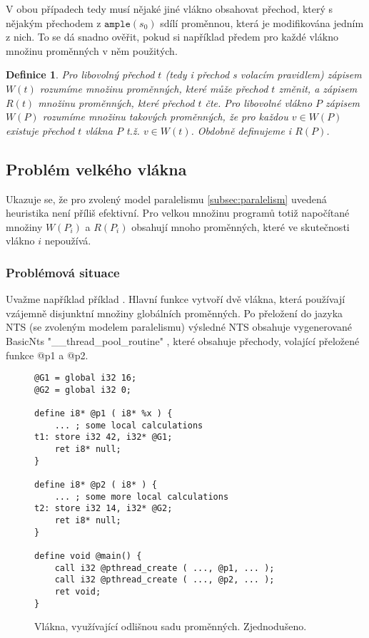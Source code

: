 \documentclass[10pt,a4paper,notitlepage]{report}
\newtheorem{definition}{Definice}
\begin{document}
V obou případech tedy musí nějaké jiné vlákno obsahovat přechod, který s nějakým přechodem z $\texttt{ample}(s_0)$ sdílí proměnnou, která je modifikována jedním z nich. To se dá snadno ověřit, pokud si například předem pro každé vlákno množinu proměnných v něm použitých.

\begin{definition}
Pro libovolný přechod $t$ (tedy i přechod s volacím pravidlem) zápisem $W(t)$ rozumíme množinu proměnných, které může přechod $t$ změnit, a zápisem $R(t)$ množinu proměnných, které přechod $t$ čte. Pro libovolné vlákno $P$ zápisem $W(P)$ rozumíme množinu takových proměnných, že pro každou $v \in W(P)$ existuje přechod $t$ vlákna $P$ t.ž. $v \in W(t)$. Obdobně definujeme i $R(P)$.
\end{definition}


\subsection{Problém velkého vlákna}
Ukazuje se, že pro zvolený model paralelismu \ref{subsec:paralelism} uvedená heuristika není příliš efektivní. Pro velkou množinu programů  totiž napočítané množiny $W(P_i)$ a $R(P_i)$ obsahují mnoho proměnných, které ve skutečnosti vlákno $i$ nepoužívá.


\subsubsection{Problémová situace}
Uvažme například příklad . Hlavní funkce vytvoří dvě vlákna, která používají vzájemně disjunktní množiny globálních proměnných. Po přeložení do jazyka NTS (se zvoleným modelem paralelismu) výsledné NTS obsahuje vygenerované BasicNts "__thread_pool_routine" , které obsahuje přechody, volající přeložené funkce @p1 a @p2.
\begin{figure}[h!]
\begin{lstlisting}
@G1 = global i32 16;
@G2 = global i32 0;

define i8* @p1 ( i8* %x ) {
	... ; some local calculations
t1:	store i32 42, i32* @G1;
	ret i8* null;
}

define i8* @p2 ( i8* ) {
	... ; some more local calculations
t2:	store i32 14, i32* @G2;
	ret i8* null;
}

define void @main() {
	call i32 @pthread_create ( ..., @p1, ... );
	call i32 @pthread_create ( ..., @p2, ... );
	ret void;
}
\end{lstlisting}
\caption{Vlákna, využívající odlišnou sadu proměnných. Zjednodušeno.}
\end{figure}
\end{document}
